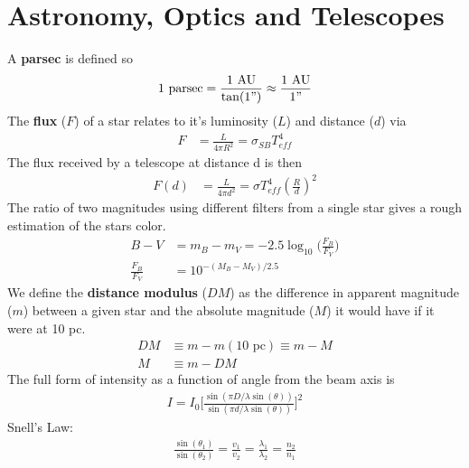 \chapter{Astronomy, Optics and Telescopes}
\thispagestyle{fancy}
\begin{multicols}{2}
A \textbf{parsec} is defined so
\begin{align}
1 \textrm{ parsec}=\frac{1\textrm{ AU}}{\tan(1")} \approx \frac{1\textrm{ AU}}{1"}
\end{align}
The \textbf{flux} ($F$) of a star relates to it's luminosity ($L$) and distance ($d$) via
\begin{align}
F  &= \frac{L}{4\pi R^2} = \sigma_{SB} T_{eff}^4
\end{align}
The flux received by a telescope at distance d is then
\begin{align}
	F(d)  &= \frac{L}{4\pi d^2} = \sigma T_{eff}^4\left(\frac{R}{d}\right)^2
\end{align}
The ratio of two magnitudes using different filters from a single star gives a rough estimation of the stars color.
\begin{align}
B-V&=m_B-m_V=-2.5\log_{10}\bigg(\frac{F_B}{F_V}\bigg) \\
\frac{F_B}{F_V}&=10^{-(M_B-M_V)/2.5}
\end{align}
We define the \textbf{distance modulus} ($DM$) as the difference in apparent magnitude ($m$) between a given star and the absolute magnitude ($M$) it would have if it were at 10 pc.
\begin{align}
DM &\equiv m-m(10 \textrm{ pc}) \equiv m-M \\
M &\equiv m-DM
\end{align}
The full form of intensity as a function of angle from the beam axis is
\begin{align}
I=I_0\bigg[\frac{\sin(\pi D/\lambda \sin(\theta))}{\sin(\pi d/\lambda \sin(\theta))} \bigg]^2
\end{align}
Snell's Law: 
\begin{align}
\frac{\sin(\theta_1)}{\sin(\theta_2)} = \frac{v_1}{v_2} = \frac{\lambda_1}{\lambda_2}=\frac{n_2}{n_1}
\end{align}







\end{multicols}
